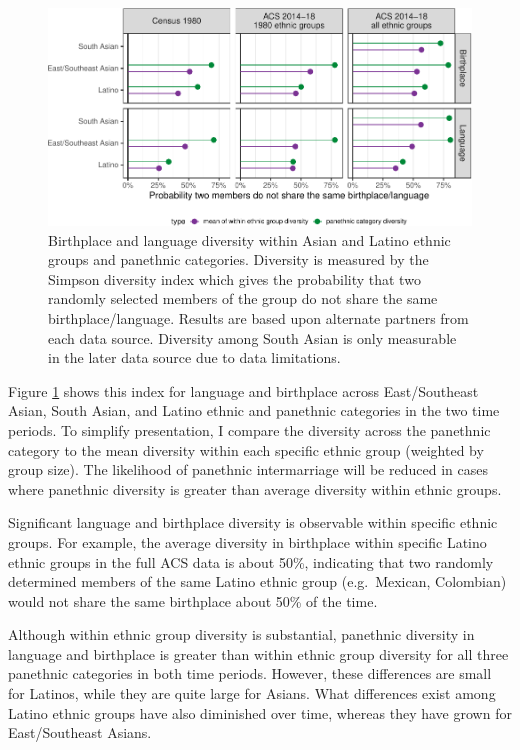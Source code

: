 \documentclass[11pt,]{article}
\begin{document}
\begin{figure}
\centering
\includegraphics{main_files/figure-latex/diversity-pan-bar-1.pdf}
\caption{\label{fig:diversity-pan-bar}Birthplace and language diversity within Asian and Latino ethnic groups and panethnic categories. Diversity is measured by the Simpson diversity index which gives the probability that two randomly selected members of the group do not share the same birthplace/language. Results are based upon alternate partners from each data source. Diversity among South Asian is only measurable in the later data source due to data limitations.}
\end{figure}

Figure \ref{fig:diversity-pan-bar} shows this index for language and birthplace across East/Southeast Asian, South Asian, and Latino ethnic and panethnic categories in the two time periods. To simplify presentation, I compare the diversity across the panethnic category to the mean diversity within each specific ethnic group (weighted by group size). The likelihood of panethnic intermarriage will be reduced in cases where panethnic diversity is greater than average diversity within ethnic groups.

Significant language and birthplace diversity is observable within specific ethnic groups. For example, the average diversity in birthplace within specific Latino ethnic groups in the full ACS data is about 50\%, indicating that two randomly determined members of the same Latino ethnic group (e.g.~Mexican, Colombian) would not share the same birthplace about 50\% of the time.

Although within ethnic group diversity is substantial, panethnic diversity in language and birthplace is greater than within ethnic group diversity for all three panethnic categories in both time periods. However, these differences are small for Latinos, while they are quite large for Asians. What differences exist among Latino ethnic groups have also diminished over time, whereas they have grown for East/Southeast Asians.
\end{document}
